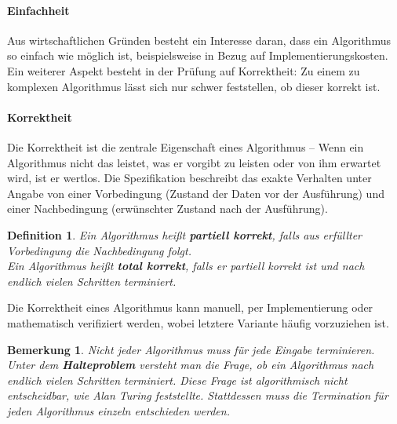 \documentclass[11pt,a4paper]{scrartcl}
\newtheorem{note}{Bemerkung}
\newtheorem{definition}{Definition}
\begin{document}
\paragraph{Einfachheit}
Aus wirtschaftlichen Gründen besteht ein Interesse daran, dass ein Algorithmus so einfach wie möglich ist, beispielsweise in Bezug auf Implementierungskosten. Ein weiterer Aspekt besteht in der Prüfung auf Korrektheit: Zu einem zu komplexen Algorithmus lässt sich nur schwer feststellen, ob dieser korrekt ist.
\paragraph{Korrektheit}
Die Korrektheit ist die zentrale Eigenschaft eines Algorithmus -- Wenn ein Algorithmus nicht das leistet, was er vorgibt zu leisten oder von ihm erwartet wird, ist er wertlos. Die Spezifikation beschreibt das exakte Verhalten unter Angabe von einer Vorbedingung (Zustand der Daten vor der Ausführung) und einer Nachbedingung (erwünschter Zustand nach der Ausführung).
\begin{definition}
Ein Algorithmus heißt \textbf{partiell korrekt}, falls aus erfüllter Vorbedingung die Nachbedingung folgt. \\
Ein Algorithmus heißt \textbf{total korrekt}, falls er partiell korrekt ist und nach endlich vielen Schritten terminiert.
\end{definition}
Die Korrektheit eines Algorithmus kann manuell, per Implementierung oder mathematisch verifiziert werden, wobei letztere Variante häufig vorzuziehen ist.
\begin{note}
Nicht jeder Algorithmus muss für jede Eingabe terminieren. Unter dem \textbf{Halteproblem} versteht man die Frage, ob ein Algorithmus nach endlich vielen Schritten terminiert. Diese Frage ist algorithmisch nicht entscheidbar, wie Alan Turing feststellte. Stattdessen muss die Termination für jeden Algorithmus einzeln entschieden werden.
\end{note}
\end{document}
